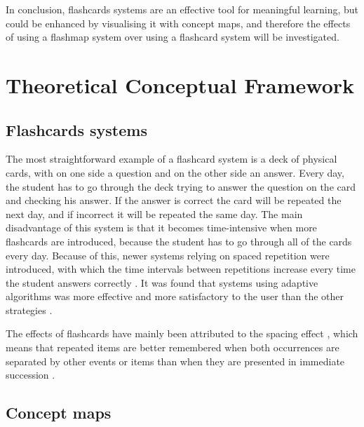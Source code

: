 
In conclusion, flashcards systems are an effective tool for meaningful learning, but could be enhanced by visualising it with concept maps, and therefore the effects of using a flashmap system over using a flashcard system will be investigated. 

\section{Theoretical Conceptual Framework}


\subsection{Flashcards systems}

The most straightforward example of a flashcard system is a deck of physical cards, with on one side a question and on the other side an answer. Every day, the student has to go through the deck trying to answer the question on the card and checking his answer. If the answer is correct the card will be repeated the next day, and if incorrect it will be repeated the same day. The main disadvantage of this system is that it becomes time-intensive when more flashcards are introduced, because the student has to go through all of the cards every day. Because of this, newer systems relying on spaced repetition were introduced, with which the time intervals between repetitions increase every time the student answers correctly . It was found that systems using adaptive algorithms was more effective and more satisfactory to the user than the other strategies \cite{microlearning}.

The effects of flashcards have mainly been attributed to the spacing effect \cite{nakata, microlearning}, which means that repeated items are better remembered when both occurrences are separated by other events or items than when they are presented in immediate succession \cite{verkoeijen, logan, siegel, xue, karpicke2}.

\subsection{Concept maps}

